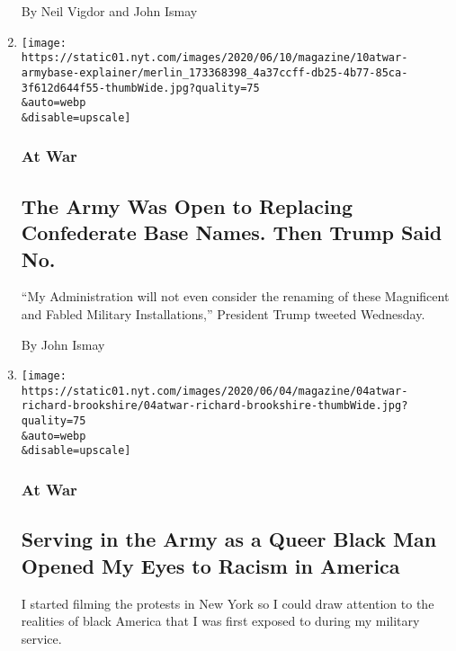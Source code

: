 \begin{enumerate}
  By Neil Vigdor and John Ismay
\item
  \href{/2020/06/10/magazine/army-confederate-base-names.html}{}

  \texttt{[image: https://static01.nyt.com/images/2020/06/10/magazine/10atwar-armybase-explainer/merlin\_173368398\_4a37ccff-db25-4b77-85ca-3f612d644f55-thumbWide.jpg?quality=75\\\&auto=webp\\\&disable=upscale]}

  \hypertarget{at-war}{%
  \subsubsection{At War}\label{at-war}}

  \hypertarget{the-army-was-open-to-replacing-confederate-base-names-then-trump-said-no}{%
  \subsection{The Army Was Open to Replacing Confederate Base Names.
  Then Trump Said
  No.}\label{the-army-was-open-to-replacing-confederate-base-names-then-trump-said-no}}

  ``My Administration will not even consider the renaming of these
  Magnificent and Fabled Military Installations,'' President Trump
  tweeted Wednesday.

  By John Ismay
\item
  \href{/2020/06/04/magazine/army-veteran-racism-protest.html}{}

  \texttt{[image: https://static01.nyt.com/images/2020/06/04/magazine/04atwar-richard-brookshire/04atwar-richard-brookshire-thumbWide.jpg?quality=75\\\&auto=webp\\\&disable=upscale]}

  \hypertarget{at-war-1}{%
  \subsubsection{At War}\label{at-war-1}}

  \hypertarget{serving-in-the-army-as-a-queer-black-man-opened-my-eyes-to-racism-in-america}{%
  \subsection{Serving in the Army as a Queer Black Man Opened My Eyes to
  Racism in
  America}\label{serving-in-the-army-as-a-queer-black-man-opened-my-eyes-to-racism-in-america}}

  I started filming the protests in New York so I could draw attention
  to the realities of black America that I was first exposed to during
  my military service.


\end{enumerate}
